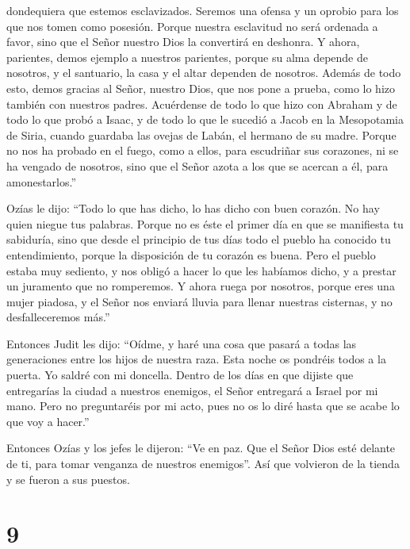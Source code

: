 dondequiera que estemos esclavizados. Seremos una ofensa y un oprobio
para los que nos tomen como posesión.  Porque nuestra
esclavitud no será ordenada a favor, sino que el Señor nuestro Dios la
convertirá en deshonra.  Y ahora, parientes, demos
ejemplo a nuestros parientes, porque su alma depende de nosotros, y el
santuario, la casa y el altar dependen de nosotros. 
Además de todo esto, demos gracias al Señor, nuestro Dios, que nos pone
a prueba, como lo hizo también con nuestros padres. 
Acuérdense de todo lo que hizo con Abraham y de todo lo que probó a
Isaac, y de todo lo que le sucedió a Jacob en la Mesopotamia de Siria,
cuando guardaba las ovejas de Labán, el hermano de su madre.
 Porque no nos ha probado en el fuego, como a ellos, para
escudriñar sus corazones, ni se ha vengado de nosotros, sino que el
Señor azota a los que se acercan a él, para amonestarlos.''

 Ozías le dijo: ``Todo lo que has dicho, lo has dicho con
buen corazón. No hay quien niegue tus palabras.  Porque
no es éste el primer día en que se manifiesta tu sabiduría, sino que
desde el principio de tus días todo el pueblo ha conocido tu
entendimiento, porque la disposición de tu corazón es buena.
 Pero el pueblo estaba muy sediento, y nos obligó a hacer
lo que les habíamos dicho, y a prestar un juramento que no romperemos.
 Y ahora ruega por nosotros, porque eres una mujer
piadosa, y el Señor nos enviará lluvia para llenar nuestras cisternas, y
no desfalleceremos más.''

 Entonces Judit les dijo: ``Oídme, y haré una cosa que
pasará a todas las generaciones entre los hijos de nuestra raza.
 Esta noche os pondréis todos a la puerta. Yo saldré con
mi doncella. Dentro de los días en que dijiste que entregarías la ciudad
a nuestros enemigos, el Señor entregará a Israel por mi mano.
 Pero no preguntaréis por mi acto, pues no os lo diré
hasta que se acabe lo que voy a hacer.''

 Entonces Ozías y los jefes le dijeron: ``Ve en paz. Que
el Señor Dios esté delante de ti, para tomar venganza de nuestros
enemigos''.  Así que volvieron de la tienda y se fueron a
sus puestos.

\hypertarget{section-8}{%
\section{9}\label{section-8}}

